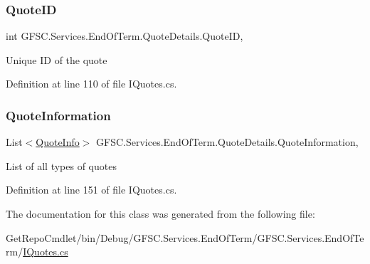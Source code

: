 \subsubsection{\texorpdfstring{Quote\+ID}{QuoteID}}
{\footnotesize\ttfamily int G\+F\+S\+C.\+Services.\+End\+Of\+Term.\+Quote\+Details.\+Quote\+ID\hspace{0.3cm}{\ttfamily [get]}, {\ttfamily [set]}}



Unique ID of the quote 



Definition at line 110 of file I\+Quotes.\+cs.

\mbox{\label{class_g_f_s_c_1_1_services_1_1_end_of_term_1_1_quote_details_a6e74b7754975f5d1b9c469a8ea50e2d5}} 
\subsubsection{\texorpdfstring{Quote\+Information}{QuoteInformation}}
{\footnotesize\ttfamily List$<$\mbox{\hyperlink{class_g_f_s_c_1_1_services_1_1_end_of_term_1_1_quote_info}{Quote\+Info}}$>$ G\+F\+S\+C.\+Services.\+End\+Of\+Term.\+Quote\+Details.\+Quote\+Information\hspace{0.3cm}{\ttfamily [get]}, {\ttfamily [set]}}



List of all types of quotes 



Definition at line 151 of file I\+Quotes.\+cs.



The documentation for this class was generated from the following file\+:\begin{DoxyCompactItemize}
\item 
Get\+Repo\+Cmdlet/bin/\+Debug/\+G\+F\+S\+C.\+Services.\+End\+Of\+Term/\+G\+F\+S\+C.\+Services.\+End\+Of\+Term/\mbox{\hyperlink{_i_quotes_8cs}{I\+Quotes.\+cs}}\end{DoxyCompactItemize}
